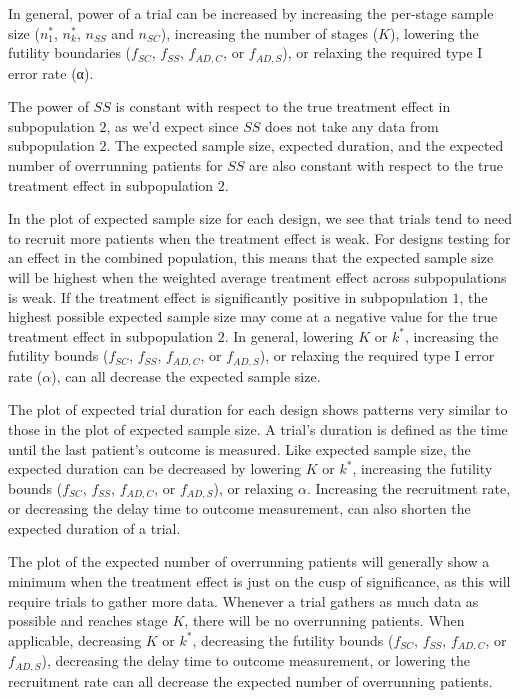 \documentclass{article}
\begin{document}
In general, power of a trial can be increased by increasing the per-stage sample size ($n_1^*$, $n_k^*$, $n_{SS}$ and $n_{SC}$), increasing the number of stages ($K$), lowering the futility boundaries ($f_{SC}$, $f_{SS}$, $f_{AD,C}$, or $f_{AD,S}$), or relaxing the required type I error rate (α).

The power of $SS$ is constant with respect to the true treatment effect in subpopulation $2$, as we'd expect since $SS$ does not take any data from subpopulation $2$. The expected sample size, expected duration, and the expected number of overrunning patients for $SS$ are also constant with respect to the true treatment effect in subpopulation $2$.

In the plot of expected sample size for each design, we see that trials tend to need to recruit more patients when the treatment effect is weak. For designs testing for an effect in the combined population, this means that the expected sample size will be highest when the weighted average treatment effect across subpopulations is weak. If the treatment effect is significantly positive in subpopulation $1$, the highest possible expected sample size may come at a negative value for the true treatment effect in subpopulation $2$. In general, lowering $K$ or $k^*$, increasing the futility bounds ($f_{SC}$, $f_{SS}$, $f_{AD,C}$, or $f_{AD,S}$), or relaxing the required type I error rate ($α$), can all decrease the expected sample size.

The plot of expected trial duration for each design shows patterns very similar to those in the plot of expected sample size. A trial's duration is defined as the time until the last patient's outcome is measured. Like expected sample size, the expected duration can be decreased by lowering $K$ or $k^*$, increasing the futility bounds ($f_{SC}$, $f_{SS}$, $f_{AD,C}$, or $f_{AD,S}$), or relaxing $α$. Increasing the recruitment rate, or decreasing the delay time to outcome measurement, can also shorten the expected duration of a trial.

The plot of the expected number of overrunning patients will generally show a minimum when the treatment effect is just on the cusp of significance, as this will require trials to gather more data. Whenever a trial gathers as much data as possible and reaches stage $K$,  there will be no overrunning patients. When applicable, decreasing $K$ or $k^*$, decreasing the futility bounds ($f_{SC}$, $f_{SS}$, $f_{AD,C}$, or $f_{AD,S}$), decreasing the delay time to outcome measurement, or lowering the recruitment rate can all decrease the expected number of overrunning patients.
\end{document}
